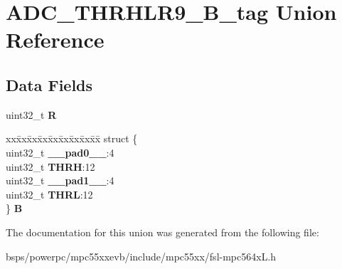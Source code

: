 \hypertarget{unionADC__THRHLR9__32B__tag}{}\section{A\+D\+C\+\_\+\+T\+H\+R\+H\+L\+R9\+\_\+B\+\_\+tag Union Reference}
\label{unionADC__THRHLR9__32B__tag}
\subsection*{Data Fields}
\begin{DoxyCompactItemize}
\item 
\mbox{\label{unionADC__THRHLR9__32B__tag_ad58ec2aa7e2c1461a60e39141b560c2a}} 
uint32\+\_\+t {\bfseries R}
\item 
\mbox{\label{unionADC__THRHLR9__32B__tag_a28311d388deebe3c9073dcdc029e4445}} 
\begin{tabbing}
xx\=xx\=xx\=xx\=xx\=xx\=xx\=xx\=xx\=\kill
struct \{\\
\>uint32\_t {\bfseries \_\_pad0\_\_}:4\\
\>uint32\_t {\bfseries THRH}:12\\
\>uint32\_t {\bfseries \_\_pad1\_\_}:4\\
\>uint32\_t {\bfseries THRL}:12\\
\} {\bfseries B}\\

\end{tabbing}\end{DoxyCompactItemize}


The documentation for this union was generated from the following file\+:\begin{DoxyCompactItemize}
\item 
bsps/powerpc/mpc55xxevb/include/mpc55xx/fsl-\/mpc564x\+L.\+h\end{DoxyCompactItemize}
